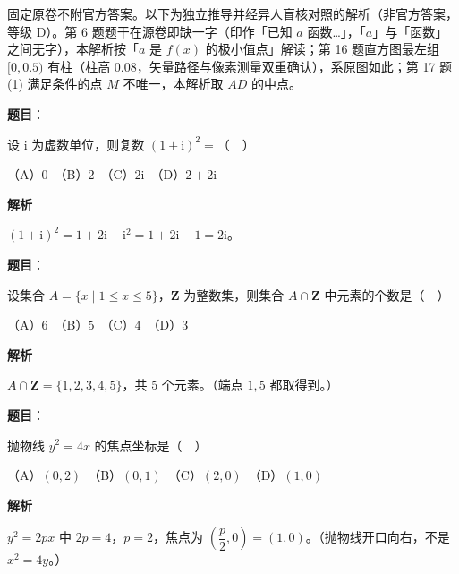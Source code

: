 

\begin{gktip}
固定原卷不附官方答案。以下为独立推导并经异人盲核对照的解析（非官方答案，等级 D）。第 6 题题干在源卷即缺一字（印作「已知 \(a\) 函数…」，「\(a\)」与「函数」之间无字），本解析按「\(a\) 是 \(f(x)\) 的极小值点」解读；第 16 题直方图最左组 \([0,0.5)\) 有柱（柱高 \(0.08\)，矢量路径与像素测量双重确认），系原图如此；第 17 题 (1) 满足条件的点 \(M\) 不唯一，本解析取 \(AD\) 的中点。
\end{gktip}

\begin{answer}

\textbf{题目}：

设 \(\mathrm{i}\) 为虚数单位，则复数 \((1+\mathrm{i})^{2}=\)（　）

（A）\(0\)　（B）\(2\)　（C）\(2\mathrm{i}\)　（D）\(2+2\mathrm{i}\)

\textbf{解析}

\((1+\mathrm{i})^{2}=1+2\mathrm{i}+\mathrm{i}^{2}=1+2\mathrm{i}-1=2\mathrm{i}\)。


\end{answer}
\begin{answer}

\textbf{题目}：

设集合 \(A=\{x\mid 1\leqslant x\leqslant 5\}\)，\(\mathbf{Z}\) 为整数集，则集合 \(A\cap\mathbf{Z}\) 中元素的个数是（　）

（A）\(6\)　（B）\(5\)　（C）\(4\)　（D）\(3\)

\textbf{解析}

\(A\cap\mathbf{Z}=\{1,2,3,4,5\}\)，共 \(5\) 个元素。（端点 \(1,5\) 都取得到。）


\end{answer}
\begin{answer}

\textbf{题目}：

抛物线 \(y^{2}=4x\) 的焦点坐标是（　）

（A）\((0,2)\)　（B）\((0,1)\)　（C）\((2,0)\)　（D）\((1,0)\)

\textbf{解析}

\(y^{2}=2px\) 中 \(2p=4\)，\(p=2\)，焦点为 \(\left(\dfrac{p}{2},0\right)=(1,0)\)。（抛物线开口向右，不是 \(x^{2}=4y\)。）


\end{answer}
